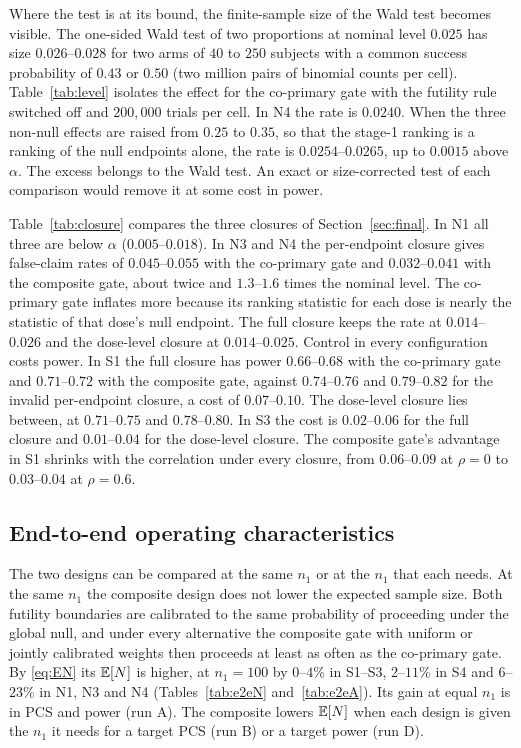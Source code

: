 Where the test is at its bound, the finite-sample size of the Wald test becomes visible. The one-sided Wald test of two proportions at nominal level $0.025$ has size $0.026$--$0.028$ for two arms of $40$ to $250$ subjects with a common success probability of $0.43$ or $0.50$ (two million pairs of binomial counts per cell). Table~\ref{tab:level} isolates the effect for the co-primary gate with the futility rule switched off and $200{,}000$ trials per cell. In N4 the rate is $0.0240$. When the three non-null effects are raised from $0.25$ to $0.35$, so that the stage-1 ranking is a ranking of the null endpoints alone, the rate is $0.0254$--$0.0265$, up to $0.0015$ above $\alpha$. The excess belongs to the Wald test. An exact or size-corrected test of each comparison would remove it at some cost in power.

Table~\ref{tab:closure} compares the three closures of Section~\ref{sec:final}. In N1 all three are below $\alpha$ ($0.005$--$0.018$). In N3 and N4 the per-endpoint closure gives false-claim rates of $0.045$--$0.055$ with the co-primary gate and $0.032$--$0.041$ with the composite gate, about twice and $1.3$--$1.6$ times the nominal level. The co-primary gate inflates more because its ranking statistic for each dose is nearly the statistic of that dose's null endpoint. The full closure keeps the rate at $0.014$--$0.026$ and the dose-level closure at $0.014$--$0.025$. Control in every configuration costs power. In S1 the full closure has power $0.66$--$0.68$ with the co-primary gate and $0.71$--$0.72$ with the composite gate, against $0.74$--$0.76$ and $0.79$--$0.82$ for the invalid per-endpoint closure, a cost of $0.07$--$0.10$. The dose-level closure lies between, at $0.71$--$0.75$ and $0.78$--$0.80$. In S3 the cost is $0.02$--$0.06$ for the full closure and $0.01$--$0.04$ for the dose-level closure. The composite gate's advantage in S1 shrinks with the correlation under every closure, from $0.06$--$0.09$ at $\rho=0$ to $0.03$--$0.04$ at $\rho=0.6$.

\subsection{End-to-end operating characteristics}\label{sec:e2e}

The two designs can be compared at the same $n_1$ or at the $n_1$ that each needs. At the same $n_1$ the composite design does not lower the expected sample size. Both futility boundaries are calibrated to the same probability of proceeding under the global null, and under every alternative the composite gate with uniform or jointly calibrated weights then proceeds at least as often as the co-primary gate. By \eqref{eq:EN} its $\mathbb{E}[N]$ is higher, at $n_1=100$ by $0$--$4$\% in S1--S3, $2$--$11$\% in S4 and $6$--$23$\% in N1, N3 and N4 (Tables~\ref{tab:e2eN} and~\ref{tab:e2eA}). Its gain at equal $n_1$ is in PCS and power (run A). The composite lowers $\mathbb{E}[N]$ when each design is given the $n_1$ it needs for a target PCS (run B) or a target power (run D).


